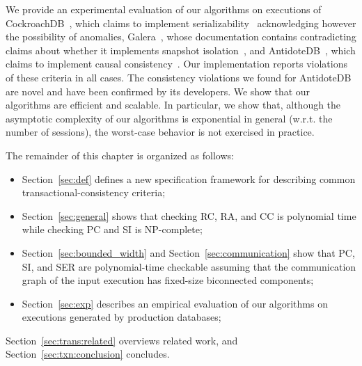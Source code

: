 We provide an experimental evaluation of our algorithms on executions of CockroachDB~\cite{cockroach}, which claims to implement serializability~\cite{cockroach-claim} acknowledging however the possibility of anomalies, Galera~\cite{galera}, whose documentation contains contradicting claims about whether it implements snapshot isolation~\cite{galera-claim,galera-notclaim}, and AntidoteDB~\cite{antidote}, which claims to implement causal consistency~\cite{antidote-claim}.
Our implementation reports violations of these criteria in all cases. 
The consistency violations we found for AntidoteDB are novel and have been confirmed by its developers. We show that our algorithms are efficient and scalable.
In particular, we show that, although the asymptotic complexity of our algorithms is exponential in general (w.r.t. the number of sessions), the worst-case behavior is not exercised in practice.

The remainder of this chapter is organized as follows:
\begin{itemize}

  \item Section~\ref{sec:def} defines a new specification framework for describing common transactional-consistency criteria;

  \item Section~\ref{sec:general} shows that checking RC, RA, and CC is polynomial time while checking PC and SI is NP-complete;

  \item Section~\ref{sec:bounded_width} and Section~\ref{sec:communication} show that PC, SI, and SER are polynomial-time checkable assuming that the communication graph of the input execution has fixed-size biconnected components;
  
  \item Section~\ref{sec:exp} describes an empirical evaluation of our algorithms on executions generated by production databases;
\end{itemize}

Section~\ref{sec:trans:related} overviews related work, and Section~\ref{sec:txn:conclusion} concludes.



